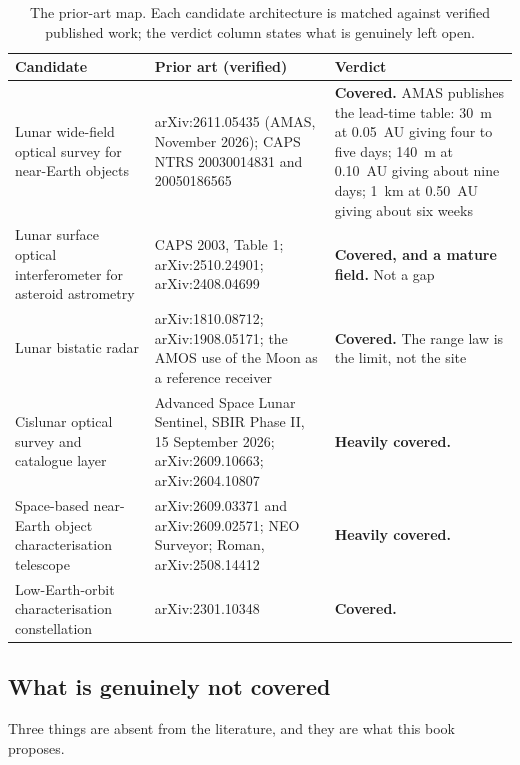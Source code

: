 \begin{table}[!htbp]
\centering
\footnotesize
\caption{The prior-art map. Each candidate architecture is matched against
verified published work; the verdict column states what is genuinely left
open.}
\label{tab:appendix-prior-art}
\begin{tabularx}{\textwidth}{@{}P{1.79in}YY@{}}
\toprule
{}
\textbf{Candidate} & \textbf{Prior art (verified)} & \textbf{Verdict} \\
\midrule
Lunar wide-field optical survey for near-Earth objects &
arXiv:2611.05435 (AMAS, November 2026); CAPS NTRS 20030014831 and
20050186565 &
\textbf{Covered.} AMAS publishes the lead-time table: 30~m at 0.05~AU
giving four to five days; 140~m at 0.10~AU giving about nine days; 1~km at
0.50~AU giving about six weeks \\
\addlinespace[2pt]
Lunar surface optical interferometer for asteroid astrometry &
CAPS 2003, Table 1; arXiv:2510.24901; arXiv:2408.04699 &
\textbf{Covered, and a mature field.} Not a gap \\
\addlinespace[2pt]
Lunar bistatic radar &
arXiv:1810.08712; arXiv:1908.05171; the AMOS use of the Moon as a
reference receiver &
\textbf{Covered.} The range law is the limit, not the site \\
\addlinespace[2pt]
Cislunar optical survey and catalogue layer &
Advanced Space Lunar Sentinel, SBIR Phase II, 15 September 2026;
arXiv:2609.10663; arXiv:2604.10807 &
\textbf{Heavily covered.} \\
\addlinespace[2pt]
Space-based near-Earth object characterisation telescope &
arXiv:2609.03371 and arXiv:2609.02571; NEO Surveyor; Roman, arXiv:2508.14412 &
\textbf{Heavily covered.} \\
\addlinespace[2pt]
Low-Earth-orbit characterisation constellation &
arXiv:2301.10348 &
\textbf{Covered.} \\
\bottomrule
\end{tabularx}
\end{table}

\subsection*{What is genuinely not covered}

Three things are absent from the literature, and they are what this book
proposes.

